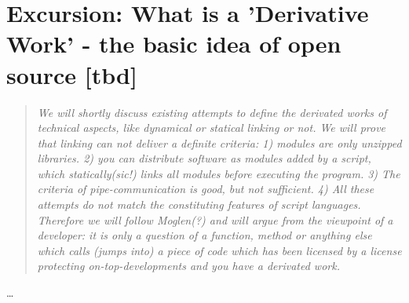 %
%
%
%
%



\section{Excursion: What is a 'Derivative Work' - the basic idea of open source [tbd]}
\footnotesize
\begin{quote}\itshape
We will shortly discuss existing attempts to define the derivated works of
technical aspects, like dynamical or statical linking or not. We will
prove that linking can not deliver a definite criteria: 1) modules are only
unzipped libraries. 2) you can distribute software as modules added by a script,
which statically(sic!) links all modules before executing the program. 3) The
criteria of pipe-communication is good, but not sufficient. 4) All these
attempts do not match the constituting features of script languages. Therefore we
will follow Moglen(?) and will argue from the viewpoint of a developer: it is
only a question of a function, method or anything else which calls (jumps into)
a piece of code which has been licensed by a license protecting
on-top-developments and you have a derivated work.
\end{quote}
\normalsize
\ldots


%
